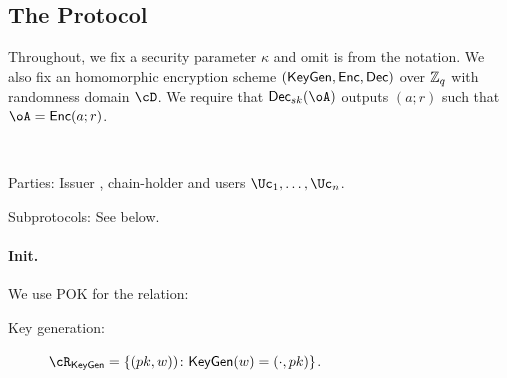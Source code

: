 \subsection{The Protocol}\label{sec:MainProtocol:Protocol}
Throughout, we fix a security parameter $\kappa$ and omit is from the notation. We also fix an homomorphic encryption scheme $(\mathsf{KeyGen},\mathsf{Enc},\mathsf{Dec})$ over ${\mathbb Z}_q$ with randomness domain $\cD$.  We require that $\Dec_{sk}(\oA)$ outputs   $(a;r)$ such that $\oA = \Enc(a;r)$.


\begin{protocol}~\label{prot:ConfidentialTransactions}


	
\item[Parties:] Issuer \Ic, chain-holder \Cc and users  $\Uc_1, \ldots,\Uc_n$.


\item[Subprotocols:]  See below.
\end{protocol}


\paragraph{Init.}
\newcommand{\rKeyGen}{{\cR_{\sf KeyGen}}}

\newcommand{\rKeyGenDef}
{
	 \set{(pk,w))\colon \KeyGen(w)= (\cdot,pk)}
}


We use POK for the relation:
\begin{description}
	\item[Key generation:]    $\rKeyGen =\rKeyGenDef$.
\end{description}


